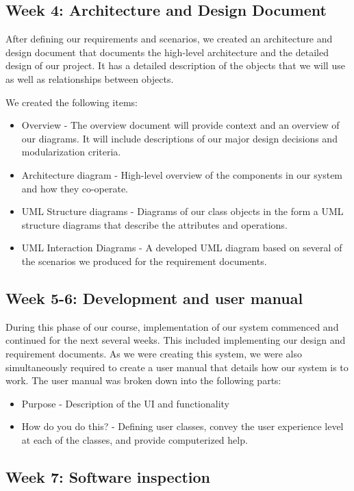 \documentclass[12pt]{article}
\begin{document}
\begin{enumerate}
\subsection*{Week 4: Architecture and Design Document}

After defining our requirements and scenarios, we created an architecture and design document that documents the high-level architecture and the detailed design of our project. It has a detailed description of the objects that we will use as well as relationships between objects. 

We created the following items: 
\begin{itemize}
\item Overview - The overview document will provide context and an overview of our diagrams. It will include descriptions of our major design decisions and modularization criteria. 
\item Architecture diagram - High-level overview of the components in our system and how they co-operate. 
\item UML Structure diagrams - Diagrams of our class objects in the form a UML structure diagrams that describe the attributes and operations.
\item UML Interaction Diagrams - A developed UML diagram based on several of the scenarios we produced for the requirement documents. 
\end{itemize}
\subsection*{Week 5-6: Development and user manual}
During this phase of our course, implementation of our system commenced and continued for the next several weeks. This included implementing our design and requirement documents. As we were creating this system, we were also simultaneously required to create a user manual that details how our system is to work. The user manual was broken down into the following parts:
\begin{itemize}
\item Purpose - Description of the UI and functionality 
\item How do you do this? - Defining user classes, convey the user experience level at each of the classes,  and provide computerized help.
\end{itemize}

\subsection*{Week 7: Software inspection}


\end{enumerate}
\end{document}
